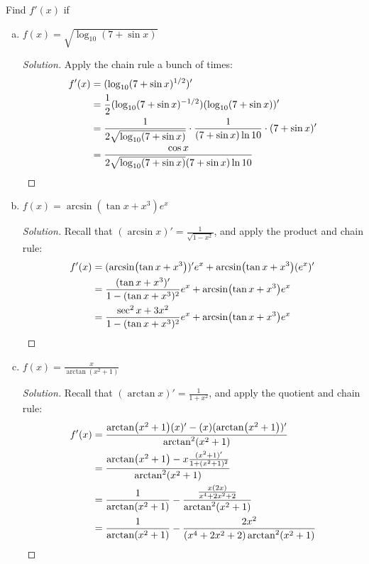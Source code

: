 \documentclass{agony}
\begin{document}
\question Find $f'(x)$ if
\begin{enumerate}[(a)]
  \item $f(x)=\sqrt{\log_{10}(7+\sin x)}$
        \begin{proof}[Solution]
          Apply the chain rule a bunch of times:
          \begin{align*}
            f'(x) & = (\log_{10}(7+\sin x)^{1/2})'                                                         \\
                  & = \frac12(\log_{10}(7+\sin x)^{-1/2})(\log_{10}(7+\sin x))'                            \\
                  & = \frac{1}{2\sqrt{\log_{10}(7+\sin x)}}\cdot\frac{1}{(7+\sin x)\ln 10}\cdot(7+\sin x)' \\
                  & = \frac{\cos x}{2\sqrt{\log_{10}(7+\sin x)}(7+\sin x)\ln 10} \qedhere
          \end{align*}
        \end{proof}
  \item $f(x)=\arcsin(\tan x+x^3)e^x$
        \begin{proof}[Solution]
          Recall that $(\arcsin x)' = \frac{1}{\sqrt{1-x^2}}$, and apply the product and chain rule:
          \begin{align*}
            f'(x) & = (\arcsin(\tan x+x^3))'e^x + \arcsin(\tan x+x^3)(e^x)'                         \\
                  & = \frac{(\tan x+x^3)'}{1-(\tan x+x^3)^2}e^x + \arcsin(\tan x+x^3)e^x            \\
                  & = \frac{\sec^2 x + 3x^2}{1-(\tan x+x^3)^2}e^x + \arcsin(\tan x+x^3)e^x \qedhere
          \end{align*}
        \end{proof}
  \item $f(x)=\frac{x}{\arctan(x^2+1)}$
        \begin{proof}[Solution]
          Recall that $(\arctan x)' = \frac{1}{1+x^2}$, and apply the quotient and chain rule:
          \begin{align*}
            f'(x) & = \frac{\arctan(x^2+1)(x)' - (x)(\arctan(x^2+1))'}{\arctan^2(x^2+1)}            \\
                  & = \frac{\arctan(x^2+1) - x\frac{(x^2+1)'}{1+(x^2+1)^2}}{\arctan^2(x^2+1)}       \\
                  & = \frac{1}{\arctan(x^2+1)} - \frac{\frac{x(2x)}{x^4+2x^2+2}}{\arctan^2(x^2+1)}  \\
                  & = \frac{1}{\arctan(x^2+1)} - \frac{2x^2}{(x^4+2x^2+2)\arctan^2(x^2+1)} \qedhere
          \end{align*}
        \end{proof}
\end{enumerate}
\end{document}
